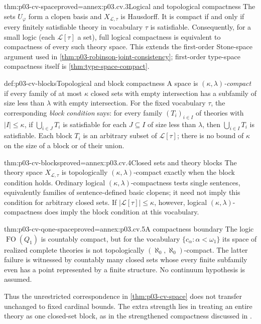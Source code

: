 \begin{hbtheorem}{thm:p03-cv-space}{proved=annex:p03.cv.3}{Logical and topological compactness}
The sets \(U_\varphi\) form a clopen basis and
\(X_{\mathscr L,\tau}\) is Hausdorff. It is compact if and only if
every finitely satisfiable theory in vocabulary \(\tau\) is
satisfiable. Consequently, for a small logic (each
\(\mathscr L[\tau]\) a set), full logical compactness is equivalent
to compactness of every such theory space.
This extends the first-order Stone-space argument used in
\cref{thm:p03-robinson-joint-consistency}; first-order type-space
compactness itself is \cref{thm:type-space-compact}.
\end{hbtheorem}

\begin{hbdefinition}{def:p03-cv-blocks}{Topological and block compactness}
A space is \emph{\((\kappa,\lambda)\)-compact} if every family
of at most \(\kappa\) closed sets with empty intersection has a
subfamily of size less than \(\lambda\) with empty intersection.
For the fixed vocabulary \(\tau\), the corresponding
\emph{block condition} says: for every family \((T_i)_{i\in I}\)
of theories with \(|I|\leq\kappa\), if
\(\bigcup_{i\in J}T_i\) is satisfiable for each \(J\subseteq I\)
of size less than \(\lambda\), then
\(\bigcup_{i\in I}T_i\) is satisfiable. Each block \(T_i\) is an
arbitrary subset of \(\mathscr L[\tau]\); there is no bound of
\(\kappa\) on the size of a block or of their union.
\end{hbdefinition}

\begin{hbtheorem}{thm:p03-cv-blocks}{proved=annex:p03.cv.4}{Closed sets and theory blocks}
The theory space \(X_{\mathscr L,\tau}\) is topologically
\((\kappa,\lambda)\)-compact exactly when the block condition
holds. Ordinary logical \((\kappa,\lambda)\)-compactness tests
single sentences, equivalently families of sentence-defined basic
clopens; it need not imply this condition for arbitrary closed sets.
If \(|\mathscr L[\tau]|\leq\kappa\), however, logical
\((\kappa,\lambda)\)-compactness does imply the block condition
at this vocabulary.
\end{hbtheorem}

\begin{hbtheorem}{thm:p03-cv-qone-space}{proved=annex:p03.cv.5}{A compactness boundary}
The logic \(\operatorname{FO}(Q_1)\) is countably compact, but
for the vocabulary \(\{c_\alpha:\alpha<\omega_1\}\) its space
of realized complete theories is not topologically
\((\aleph_0,\aleph_0)\)-compact. The latter failure is witnessed
by countably many closed sets whose every finite subfamily even
has a point represented by a finite structure.
No continuum hypothesis is assumed.
\end{hbtheorem}

Thus the unrestricted correspondence in \cref{thm:p03-cv-space}
does not transfer unchanged to fixed cardinal bounds. The extra
strength lies in treating an entire theory as one closed-set block,
as in the strengthened compactness discussed in
\cite[Ch.~II, \S5.1, p.~60]{Ebbinghaus1985ExtendedLogics}.
